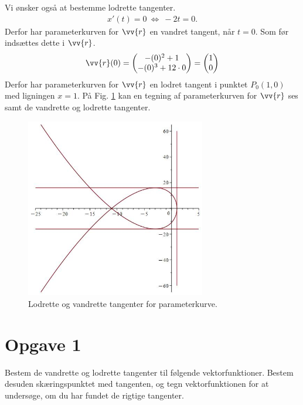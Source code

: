 \begin{exa}
	Vi ønsker også at bestemme lodrette tangenter.
	\begin{align*}
		x'(t) = 0 \ \Leftrightarrow \	-2t=0.
	\end{align*}
	Derfor har parameterkurven for $\vv{r}$ en vandret tangent, når $t=0$. Som før indsættes dette i $\vv{r}$.
	\begin{align*}
		\vv{r}(0) = 
		\begin{pmatrix}
			-(0)^2+1 \\
			-(0)^3+12\cdot 0
		\end{pmatrix} =
		\begin{pmatrix}
			1 \\
			0
		\end{pmatrix}
	\end{align*}
	Derfor har parameterkurven for $\vv{r}$ en lodret tangent i punktet $P_0(1,0)$ med ligningen $x=1$.
	På Fig. \ref{fig:tangentgraf} kan en tegning af parameterkurven for $\vv{r}$ ses samt de vandrette og lodrette tangenter. 
	\begin{figure}[H]
		\centering
		\includegraphics[width=0.7\textwidth]{Billeder/vektortangent.jpg}
		\caption{Lodrette og vandrette tangenter for parameterkurve.}
		\label{fig:tangentgraf}
	\end{figure}
\end{exa}

\section*{Opgave 1}

Bestem de vandrette og lodrette tangenter til følgende vektorfunktioner. Bestem desuden skæringspunktet med tangenten, og tegn vektorfunktionen for at undersøge, om du har fundet de rigtige tangenter.

